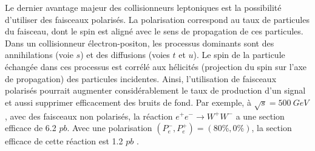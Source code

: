 Le dernier avantage majeur des collisionneurs leptoniques est la possibilité d'utiliser des faisceaux polarisés. La polarisation correspond au taux de particules du faisceau, dont le spin est aligné avec le sens de propagation de ces particules. Dans un collisionneur électron-positon, les processus dominants sont des annihilations (voie $s$) et des diffusions (voies $t$ et $u$). Le spin de la particule échangée dans ces processus est corrélé aux hélicités (projection du spin sur l'axe de propagation) des particules incidentes. Ainsi, l'utilisation de faisceaux polarisés pourrait augmenter considérablement le taux de production d'un signal et aussi supprimer efficacement des bruits de fond. Par exemple, à $\sqrt{s}=500~GeV$, avec des faisceaux non polarisés, la réaction $e^+e^-\rightarrow W^+W^-$ a une section efficace de 6.2 $pb$. Avec une polarisation $(P_e^{-},P_e^{+})=(80\%,0\%)$, la section efficace de cette réaction est 1.2 $pb$ \cite{polarised_elec_beam}.

